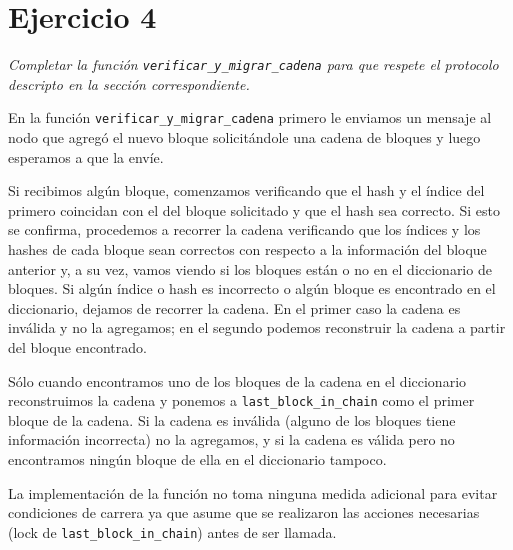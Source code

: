 \section{Ejercicio 4}

\emph{Completar la función \texttt{verificar\_y\_migrar\_cadena} para que respete el protocolo descripto en la sección correspondiente.}

En la función \texttt{verificar\_y\_migrar\_cadena} primero le enviamos un mensaje al nodo que agregó el nuevo bloque solicitándole una cadena de bloques y luego esperamos a que la envíe.

Si recibimos algún bloque, comenzamos verificando que el hash y el índice del primero coincidan con el del bloque solicitado y que el hash sea correcto. Si esto se confirma, procedemos a recorrer la cadena verificando que los índices y los hashes de cada bloque sean correctos con respecto a la información del bloque anterior y, a su vez, vamos viendo si los bloques están o no en el diccionario de bloques. Si algún índice o hash es incorrecto o algún bloque es encontrado en el diccionario, dejamos de recorrer la cadena. En el primer caso la cadena es inválida y no la agregamos; en el segundo podemos reconstruir la cadena a partir del bloque encontrado.

Sólo cuando encontramos uno de los bloques de la cadena en el diccionario  reconstruimos la cadena y ponemos a \texttt{last\_block\_in\_chain} como el primer bloque de la cadena. Si la cadena es inválida (alguno de los bloques tiene información incorrecta) no la agregamos, y si la cadena es válida pero no encontramos ningún bloque de ella en el diccionario tampoco.

La implementación de la función no toma ninguna medida adicional para evitar condiciones de carrera ya que asume que se realizaron las acciones necesarias (lock de \texttt{last\_block\_in\_chain}) antes de ser llamada.